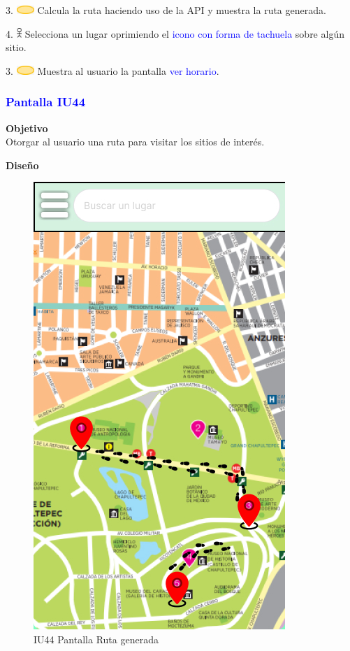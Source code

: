     3. \includegraphics[width=0.0500\textwidth]{Figuras/sistema.png} Calcula la ruta haciendo uso de la API y muestra la ruta generada.

    4. \includegraphics[width=0.0150\textwidth]{Figuras/persona.png} Selecciona un lugar oprimiendo el \textcolor{blue}{icono con forma de tachuela} sobre algún sitio.

    3. \includegraphics[width=0.0500\textwidth]{Figuras/sistema.png} Muestra al usuario la pantalla \textcolor{blue}{ver horario}.
    
\subsubsection{\textcolor{blue}{Pantalla IU44}}

\textbf{Objetivo} \\
Otorgar al usuario una ruta para visitar los sitios de interés.

\textbf{Diseño}
    \begin{figure}[h]
        
            \centering
            \includegraphics[width=.4\linewidth]{Pantallas Prototipo3/IU44-Ruta generada.jpg}
        \caption{IU44 Pantalla Ruta generada}
    
    \end{figure}


